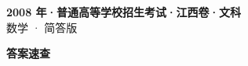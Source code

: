 \documentclass[zihao=-4, a4paper]{ctexart}
\begin{document}
\begin{center}
  {\Large\bfseries 2008 年·普通高等学校招生考试·江西卷·文科}\\[4pt]
  {\large 数学 · 简答版}
\end{center}
\medskip
{}

\clearpage
{}
\begin{center}{\Large\bfseries 答案速查}\end{center}
\medskip

\end{document}
